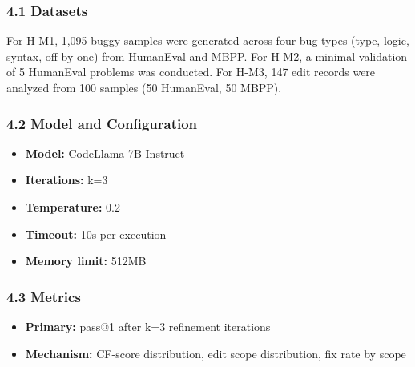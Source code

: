 
\subsubsection{4.1 Datasets}

\begin{table}[htbp]
\centering
{}
\end{table}

For H-M1, 1,095 buggy samples were generated across four bug types (type, logic, syntax, off-by-one) from HumanEval and MBPP. For H-M2, a minimal validation of 5 HumanEval problems was conducted. For H-M3, 147 edit records were analyzed from 100 samples (50 HumanEval, 50 MBPP).

\subsubsection{4.2 Model and Configuration}

\begin{itemize}
\item \textbf{Model:} CodeLlama-7B-Instruct
\item \textbf{Iterations:} k=3
\item \textbf{Temperature:} 0.2
\item \textbf{Timeout:} 10s per execution
\item \textbf{Memory limit:} 512MB
\end{itemize}

\subsubsection{4.3 Metrics}

\begin{itemize}
\item \textbf{Primary:} pass@1 after k=3 refinement iterations
\item \textbf{Mechanism:} CF-score distribution, edit scope distribution, fix rate by scope
\end{itemize}
